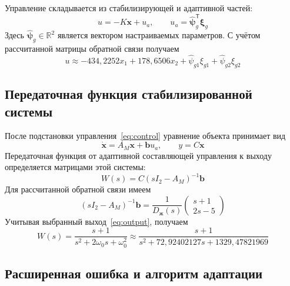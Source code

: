 Управление складывается из стабилизирующей и адаптивной частей:
\begin{equation}
  u=-K\bm x+u_a,
  \qquad u_a=\hat{\bm\psi}_g^{\mathsf T}\bm\xi_g
  \label{eq:control}
\end{equation}
Здесь $\hat{\bm\psi}_g\in\mathbb R^2$ является вектором настраиваемых
параметров. С учётом рассчитанной матрицы обратной связи получаем
\begin{equation}
  u\approx-434{,}2252x_1+178{,}6506x_2
    +\hat\psi_{g1}\xi_{g1}+\hat\psi_{g2}\xi_{g2}
  \label{eq:control-numeric}
\end{equation}

\subsection{Передаточная функция стабилизированной системы}

После подстановки управления~\eqref{eq:control} уравнение объекта
принимает вид
\begin{equation}
  \dot{\bm x}=A_M\bm x+\bm b u_a,
  \qquad y=C\bm x
  \label{eq:stabilized-plant}
\end{equation}
Передаточная функция от адаптивной составляющей управления к выходу
определяется матрицами этой системы:
\begin{equation}
  W(s)=C(sI_2-A_M)^{-1}\bm b
  \label{eq:stable-transfer}
\end{equation}
Для рассчитанной обратной связи имеем
\begin{equation}
  (sI_2-A_M)^{-1}\bm b
  =\frac{1}{D_{\text{ж}}(s)}
    \begin{pmatrix}s+1\\2s-5\end{pmatrix}
  \label{eq:transfer-vector}
\end{equation}
Учитывая выбранный выход~\eqref{eq:output}, получаем
\begin{equation}
  W(s)=\frac{s+1}{s^2+2\omega_0s+\omega_0^2}
  \approx\frac{s+1}{s^2+72{,}92402127s+1329{,}47821969}
  \label{eq:stable-transfer-numeric}
\end{equation}

\subsection{Расширенная ошибка и алгоритм адаптации}

